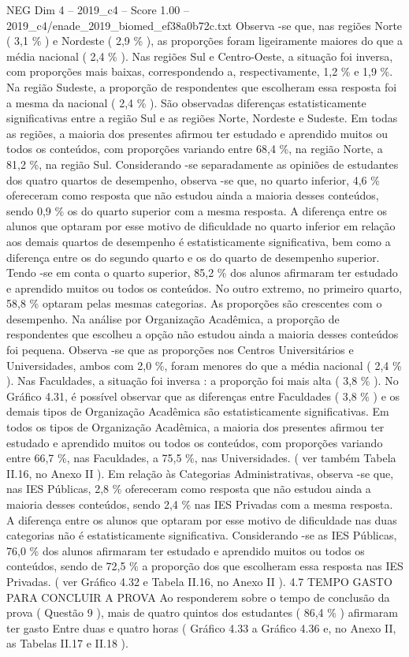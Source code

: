 \begin{textsample}{NEG Dim 4 – 2019\_c4 – Score 1.00 – 2019\_c4/enade\_2019\_biomed\_ef38a0b72c.txt}
Observa -se que, nas regiões Norte ( 3,1 \% ) e Nordeste ( 2,9 \% ), as proporções foram ligeiramente maiores do que a média nacional ( 2,4 \% ).
Nas regiões Sul e Centro-Oeste, a situação foi inversa, com proporções mais baixas, correspondendo a, respectivamente, 1,2 \% e 1,9 \%.
Na região Sudeste, a proporção de respondentes que escolheram essa resposta foi a mesma da nacional ( 2,4 \% ).
São observadas diferenças estatisticamente significativas entre a região Sul e as regiões Norte, Nordeste e Sudeste.
Em todas as regiões, a maioria dos presentes afirmou ter estudado e aprendido muitos ou todos os conteúdos, com proporções variando entre 68,4 \%, na região Norte, a 81,2 \%, na região Sul.
Considerando -se separadamente as opiniões de estudantes dos quatro quartos de desempenho, observa -se que, no quarto inferior, 4,6 \% ofereceram como resposta que não estudou ainda a maioria desses conteúdos, sendo 0,9 \% os do quarto superior com a mesma resposta.
A diferença entre os alunos que optaram por esse motivo de dificuldade no quarto inferior em relação aos demais quartos de desempenho é estatisticamente significativa, bem como a diferença entre os do segundo quarto e os do quarto de desempenho superior.
Tendo -se em conta o quarto superior, 85,2 \% dos alunos afirmaram ter estudado e aprendido muitos ou todos os conteúdos.
No outro extremo, no primeiro quarto, 58,8 \% optaram pelas mesmas categorias.
As proporções são crescentes com o desempenho.
Na análise por Organização Acadêmica, a proporção de respondentes que escolheu a opção não estudou ainda a maioria desses conteúdos foi pequena.
Observa -se que as proporções nos Centros Universitários e Universidades, ambos com 2,0 \%, foram menores do que a média nacional ( 2,4 \% ).
Nas Faculdades, a situação foi inversa : a proporção foi mais alta ( 3,8 \% ).
No Gráfico 4.31, é possível observar que as diferenças entre Faculdades ( 3,8 \% ) e os demais tipos de Organização Acadêmica são estatisticamente significativas.
Em todos os tipos de Organização Acadêmica, a maioria dos presentes afirmou ter estudado e aprendido muitos ou todos os conteúdos, com proporções variando entre 66,7 \%, nas Faculdades, a 75,5 \%, nas Universidades. ( ver também Tabela II.16, no Anexo II ).
Em relação às Categorias Administrativas, observa -se que, nas IES Públicas, 2,8 \% ofereceram como resposta que não estudou ainda a maioria desses conteúdos, sendo 2,4 \% nas IES Privadas com a mesma resposta.
A diferença entre os alunos que optaram por esse motivo de dificuldade nas duas categorias não é estatisticamente significativa.
Considerando -se as IES Públicas, 76,0 \% dos alunos afirmaram ter estudado e aprendido muitos ou todos os conteúdos, sendo de 72,5 \% a proporção dos que escolheram essa resposta nas IES Privadas. ( ver Gráfico 4.32 e Tabela II.16, no Anexo II ). 4.7 TEMPO GASTO PARA CONCLUIR A PROVA Ao responderem sobre o tempo de conclusão da prova ( Questão 9 ), mais de quatro quintos dos estudantes ( 86,4 \% ) afirmaram ter gasto Entre duas e quatro horas ( Gráfico 4.33 a Gráfico 4.36 e, no Anexo II, as Tabelas II.17 e II.18 ).

\end{textsample}
